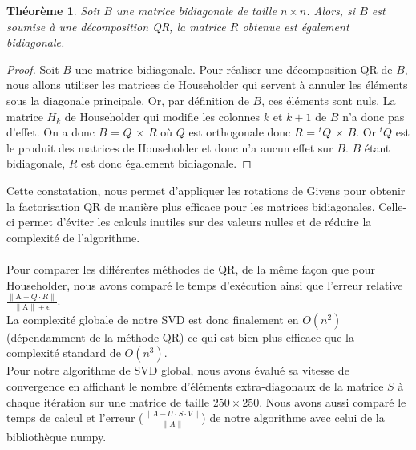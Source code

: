 \documentclass{article}
\newtheorem{theorem}{Théorème}
\begin{document}
\begin{theorem}
  \label{th:bidiagonal}
  Soit $B$ une matrice bidiagonale de taille $n \times n$. Alors, si $B$ est soumise à une décomposition QR, la matrice $R$ obtenue est également bidiagonale.
\end{theorem}
\begin{proof}
  Soit $B$ une matrice bidiagonale. Pour réaliser une décomposition QR de $B$, nous allons utiliser les matrices de Householder qui servent à annuler les éléments sous la diagonale principale. Or, par définition de $B$, ces éléments sont nuls. La matrice $H_{k}$ de Householder qui modifie les colonnes $k$ et $k+1$ de $B$ n'a donc pas d'effet. On a donc $B$ = $Q$ $\times$ $R$ où $Q$ est orthogonale donc $R$ = ${}^t\!Q$ $\times$ $B$. Or ${}^t\!Q$ est le produit des matrices de Householder et donc n'a aucun effet sur $B$. $B$ étant bidiagonale, $R$ est donc également bidiagonale.
\end{proof}
Cette constatation, nous permet d'appliquer les rotations de Givens pour obtenir la factorisation QR de manière plus efficace pour les matrices bidiagonales. Celle-ci permet d'éviter les calculs inutiles sur des valeurs nulles et de réduire la complexité de l'algorithme.
\\ \\
Pour comparer les différentes méthodes de QR, de la même façon que pour Householder, nous avons comparé le temps d'exécution ainsi que l'erreur relative \(\frac{\| \text{A} - Q \cdot R \|}{\| \text{A} \| + \epsilon}\). \\
La complexité globale de notre SVD est donc finalement en $O(n^2)$ (dépendamment de la méthode QR) ce qui est bien plus efficace que la complexité standard de $O(n^3)$.
\\
Pour notre algorithme de SVD global, nous avons évalué sa vitesse de convergence en affichant le nombre d'éléments extra-diagonaux de la matrice $S$ à chaque itération sur une matrice de taille $250 \times 250$. Nous avons aussi comparé le temps de calcul et l'erreur (\(\frac{\| A - U \cdot S \cdot V \|}{\| A \|}\)) de notre algorithme avec celui de la bibliothèque numpy.
\end{document}

